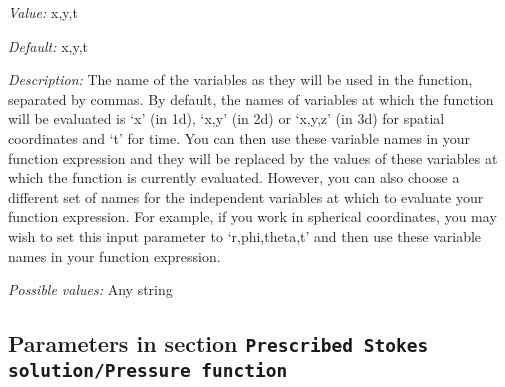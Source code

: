 \begin{itemize}
{\it Value:} x,y,t


{\it Default:} x,y,t


{\it Description:} The name of the variables as they will be used in the function, separated by commas. By default, the names of variables at which the function will be evaluated is `x' (in 1d), `x,y' (in 2d) or `x,y,z' (in 3d) for spatial coordinates and `t' for time. You can then use these variable names in your function expression and they will be replaced by the values of these variables at which the function is currently evaluated. However, you can also choose a different set of names for the independent variables at which to evaluate your function expression. For example, if you work in spherical coordinates, you may wish to set this input parameter to `r,phi,theta,t' and then use these variable names in your function expression.


{\it Possible values:} Any string
\end{itemize}

\subsection{Parameters in section \tt Prescribed Stokes solution/Pressure function}
\label{parameters:Prescribed_20Stokes_20solution/Pressure_20function}

